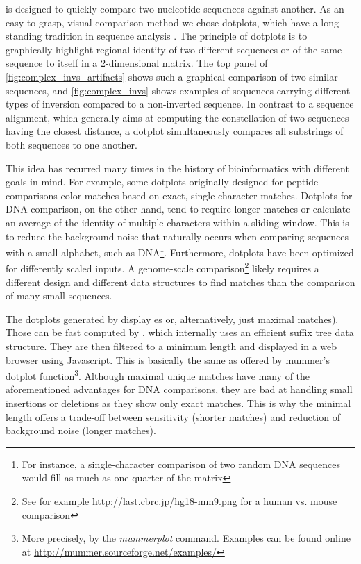 \maze is designed to quickly compare two nucleotide sequences against another.
As an easy-to-grasp, visual comparison method we chose dotplots, which have a
long-standing tradition in sequence analysis \citep{Fitch1969,Gibbs1970}. The
principle of dotplots is to graphically highlight regional identity of two
different sequences or of the same sequence to itself in a 2-dimensional matrix.
The top panel of \cref{fig:complex_invs_artifacts} shows such a graphical
comparison of two similar sequences, and \cref{fig:complex_invs} shows examples
of sequences carrying different types of inversion compared to a non-inverted
sequence. In contrast to a sequence alignment, which generally aims at computing
the constellation of two sequences having the closest distance, a dotplot
simultaneously compares all substrings of both sequences to one another.

This idea has recurred many times in the history of bioinformatics with
different goals in mind. For example, some dotplots originally designed for
peptide comparisons color matches based on exact, single-character matches.
Dotplots for DNA comparison, on the other hand, tend to require longer matches
or calculate an average of the identity of multiple characters within a sliding
window. This is to reduce the background noise that naturally occurs when
comparing sequences with a small alphabet, such as DNA\footnote{For instance, a
single-character comparison of two random DNA sequences would fill as much as
one quarter of the matrix}. Furthermore, dotplots have been optimized for
differently scaled inputs. A genome-scale comparison\footnote{See for example
\url{http://last.cbrc.jp/hg18-mm9.png} for a human vs. mouse comparison}
likely requires a different design and different data structures to find matches
than the comparison of many small sequences.

The dotplots generated by \maze display es or,
alternatively, just maximal matches). Those can be fast computed by \mummer,
which internally uses an efficient suffix tree data structure. They are then
filtered to a minimum length and displayed in a web browser using Javascript.
This is basically the same as offered by \acs{mummer}'s dotplot function\footnote{
More precisely, by the \emph{mummerplot} command. Examples can be found online
at \url{http://mummer.sourceforge.net/examples/}}. Although maximal unique
matches have many of the aforementioned advantages for DNA comparisons, they are
bad at handling small insertions or deletions as they show only exact matches.
This is why the minimal length offers a trade-off between sensitivity
(shorter matches) and reduction of background noise (longer matches).

